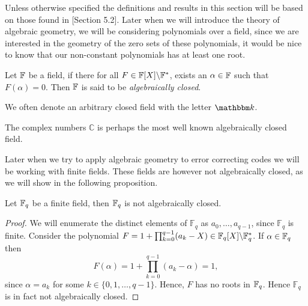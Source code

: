 Unless otherwise specified the definitions and results in this section will be based on those found in \cite{lang}[Section 5.2].
Later when we will introduce the theory of algebraic geometry, we will be considering polynomials over a field, since we are interested in the geometry of the zero sets of these polynomials, it would be nice to know that our non-constant polynomials has at least one root.
\begin{definition}\label{def:alg_closed}
  Let $\mathbb{F}$ be a field, if there for all $F \in \mathbb{F}[X] \backslash \mathbb{F}^*$, exists an $\alpha \in \mathbb{F}$ such that $F(\alpha) = 0$. Then $\mathbb{F}$ is said to be \textit{algebraically closed}.
\end{definition}
\begin{remark}
  We often denote an arbitrary closed field with the letter $\K$.
\end{remark}
\begin{example}\label{exmp:complex}
  The complex numbers $\mathbb{C}$ is perhaps the most well known algebraically closed field.
\end{example}
Later when we try to apply algebraic geometry to error correcting codes we will be working with finite fields. These fields are however not algebraically closed, as we will show in the following proposition.
\begin{proposition}\label{prop:finite_fields_arent_algebraicly_closed}
  Let $\mathbb{F}_{q}$ be a finite field, then $\mathbb{F}_{q}$ is not algebraically closed.
\end{proposition}
\begin{proof}
  We will enumerate the distinct elements of $\mathbb{F}_{q}$ as $a_{0}, \ldots, a_{q - 1}$, since $\mathbb{F}_{q}$ is finite. Consider the polynomial $F = 1 + \prod^{q - 1}_{k = 0} (a_{k} - X) \in \mathbb{F}_{q}[X] \backslash \mathbb{F}_{q}^{*}$. If $\alpha \in \mathbb{F}_{q}$ then
  \begin{equation*}
    F(\alpha) = 1 + \prod^{q - 1}_{k = 0} (a_{k} - \alpha) = 1,
  \end{equation*}
  since $\alpha = a_{k}$ for some $k \in \{0,1, \ldots, q - 1\}$. Hence, $F$ has no roots in $\mathbb{F}_{q}$. Hence $\mathbb{F}_{q}$ is in fact not algebraically closed.
\end{proof}

